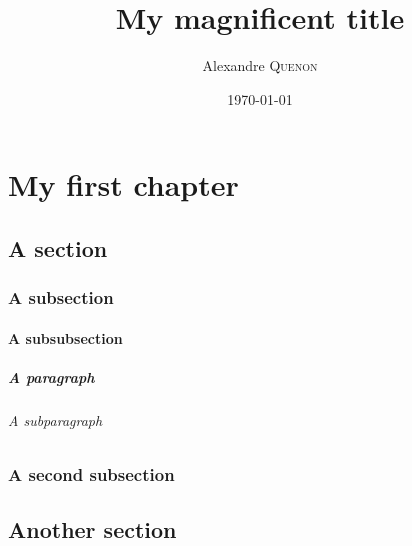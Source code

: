 \documentclass[%
	papersize=a4,%
	pagelayout=default,%
	fontname=latinmodern,%
	fontsize=11pt,%
	twoside,%
	final,%
	faculty=fpms%
]{umons-Thesis}%
\author{Alexandre \textsc{Quenon}}
\date{\today}
\title{My magnificent title}
\begin{document}
	
\umonsThesisTitlePage


\frontmatter

	\begin{umonsThesisAbstract}
		\lipsum[1-2]
	\end{umonsThesisAbstract}

	
	\tableofcontents*
	

\mainmatter

	\chapter{My first chapter}
	
		\lipsum[1-3]
		
		
		\section{A section}
		
			\lipsum[4-6]
			
			
			\subsection{A subsection}
			
				\lipsum[7-9]
				
				\subsubsection{A subsubsection}
				
					\lipsum[10]
					
					\paragraph{A paragraph}
					
						\lipsum[11]
						
						\subparagraph{A subparagraph}
						
							\blindtext
			
			\subsection{A second subsection}
			
				\lipsum[13-15]
		
		
		\section{Another section}
		
			\lipsum[4-6]
			
\end{document}
